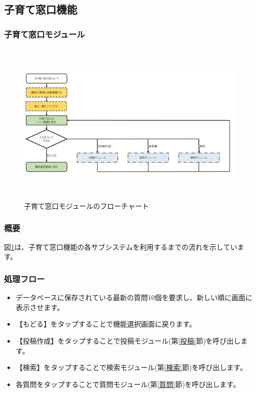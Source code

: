 \documentclass[a4j]{jarticle}
\begin{document}
\subsection{子育て窓口機能}
\subsubsection{子育て窓口モジュール\label{子育て窓口}} %
\begin{figure}[H]
    \begin{center}
      \includegraphics[height=8.0cm] {子育て窓口_全体.png} %
    \caption {子育て窓口モジュールのフローチャート}
    \label{子育て窓口_全体}
    \end{center}
\end{figure}
\subsubsection*{概要}
図\ref{子育て窓口_全体}は、子育て窓口機能の各サブシステムを利用するまでの流れを示しています。
\subsubsection*{処理フロー}
\begin{itemize}
\item データベースに保存されている最新の質問10個を要求し、新しい順に画面に表示させます。
\item 【もどる】をタップすることで機能選択画面に戻ります。
\item 【投稿作成】をタップすることで投稿モジュール(第\ref{投稿}節)を呼び出します。
\item 【検索】をタップすることで検索モジュール(第\ref{検索}節)を呼び出します。
\item 各質問をタップすることで質問モジュール(第\ref{質問}節)を呼び出します。

\end{itemize}
\end{document}
